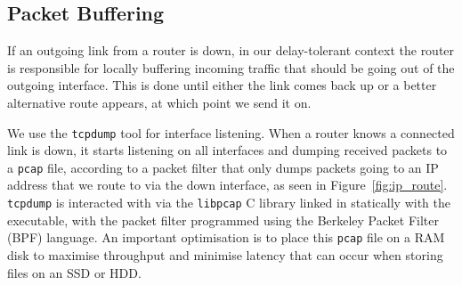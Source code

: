 \documentclass[withindex,glossary,openany]{cam-thesis}
\begin{document}


\subsection{Packet Buffering}

If an outgoing link from a router is down, in our delay-tolerant context the router is responsible for locally buffering incoming traffic that should be going out of the outgoing interface. This is done until either the link comes back up or a better alternative route appears, at which point we send it on.

We use the \texttt{tcpdump} tool for interface listening. When a router knows a connected link is down, it starts listening on all interfaces and dumping received packets to a \texttt{pcap} file, according to a packet filter that only dumps packets going to an IP address that we route to via the down interface, as seen in Figure~\ref{fig:ip_route}. \texttt{tcpdump} is interacted with via the \texttt{libpcap} C library linked in statically with the executable, with the packet filter programmed using the Berkeley Packet Filter (BPF) language. An important optimisation is to place this \texttt{pcap} file on a RAM disk to maximise throughput and minimise latency that can occur when storing files on an SSD or HDD.
\end{document}
